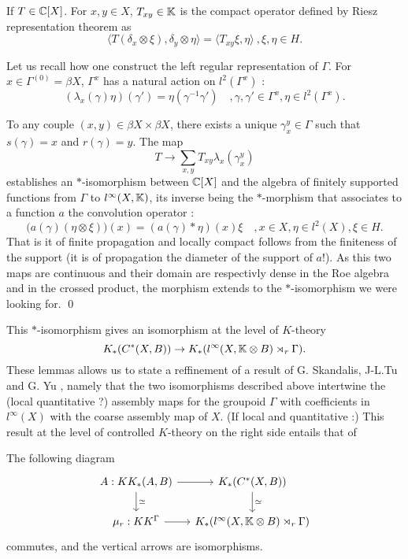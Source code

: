 \begin{dem}
If $T\in \mathbb C[X]$. For $x,y\in X$, $T_{xy}\in \mathbb K$ is the compact operator defined by Riesz representation theorem as 
\[\langle T(\delta_x \otimes \xi),\delta_y \otimes \eta\rangle =\langle T_{xy}\xi,\eta\rangle \ ,\xi, \eta\in H.\]

Let us recall how one construct the left regular representation of $\Gamma$. For $x\in \Gamma^{(0)}=\beta X$, $\Gamma^x$ has a natural action on $l^2(\Gamma^x)$ :
\[(\lambda_x(\gamma)\eta)(\gamma')=\eta(\gamma^{-1}\gamma')\quad,\gamma,\gamma'\in \Gamma^x,\eta\in l^2(\Gamma^x) .\] 

To any couple $(x,y)\in \beta X\times \beta X$, there exists a unique $\gamma_x^y\in \Gamma$ such that $s(\gamma)=x$ and $r(\gamma)=y$. The map
\[T\rightarrow \sum_{x,y} T_{xy} \lambda_x(\gamma_x^y)\]
establishes an $*$-isomorphism between $\mathbb C[X]$ and the algebra of finitely supported functions from $\Gamma$ to $l^\infty(X,\mathbb K)$, its inverse being the $*$-morphism that associates to a function $a$ the convolution operator : 
\[\big(a(\gamma)(\eta\otimes \xi)\big) (x)= (a(\gamma)\ast\eta)(x)\xi \quad, x\in X,\eta\in l^2(X),\xi\in H. \]
That is it of finite propagation and locally compact follows from the finiteness of the support (it is of propagation the diameter of the support of $a$!). As this two maps are continuous and their domain are respectivly dense in the Roe algebra and in the crossed product, the morphism extends to the $*$-isomorphism we were looking for.
\qed
\end{dem}

This $*$-isomorphism gives an isomorphism at the level of $K$-theory 
\[ K_*(C^* (X,B))\rightarrow K_*(l^\infty(X,\mathbb K\otimes B)\rtimes_r \Gamma).\]
These lemmas allows us to state a reffinement of a result of G. Skandalis, J-L.Tu and G. Yu \cite{SkTuYu}, namely that the two isomorphisms described above intertwine the (local quantitative ?) assembly maps for the groupoid $\Gamma$ with coefficients in $l^\infty(X)$ with the coarse assembly map of $X$. (If local and quantitative :) This result at the level of controlled $K$-theory on the right side entails that of \cite{SkTuYu}

\begin{thm}
The following diagram
\[\begin{tikzcd}[column sep = small]
A : KK_*(A,B)\arrow{r}\arrow{d}{\simeq} & K_*(C^*(X,B)) \arrow{d}{\simeq}\\
\mu_{r} : KK^\Gamma \arrow{r} & K_*(l^\infty(X,\K\otimes B)\rtimes_r \Gamma)
\end{tikzcd}\]
commutes, and the vertical arrows are isomorphisms.
\end{thm}



















